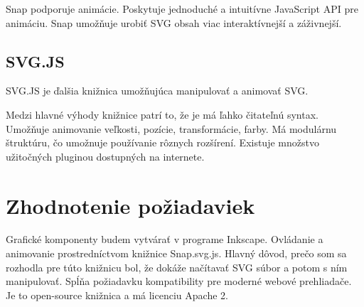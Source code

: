 Snap podporuje animácie. Poskytuje jednoduché a intuitívne JavaScript API pre animáciu. Snap umožňuje urobiť SVG obsah viac interaktívnejší a záživnejší. \cite{snapsvg}



\subsection{SVG.JS}

SVG.JS je ďalšia knižnica umožňujúca manipulovať a animovať SVG.

Medzi hlavné výhody knižnice patrí to, že je má ľahko čitateľnú syntax. Umožňuje animovanie veľkosti, pozície, transformácie, farby. Má modulárnu štruktúru, čo umožnuje používanie rôznych rozšírení. Existuje množstvo užitočných pluginou dostupných na internete. \cite{svgjs}

%

\section{Zhodnotenie požiadaviek}
Grafické komponenty budem vytvárať v programe Inkscape. Ovládanie a animovanie prostredníctvom knižnice Snap.svg.js. Hlavný dôvod, prečo som sa rozhodla pre túto knižnicu bol, že dokáže načítavať SVG súbor a potom s ním manipulovať.
Spĺňa požiadavku kompatibility pre moderné webové prehliadače. Je to open-source knižnica a má licenciu Apache 2.  